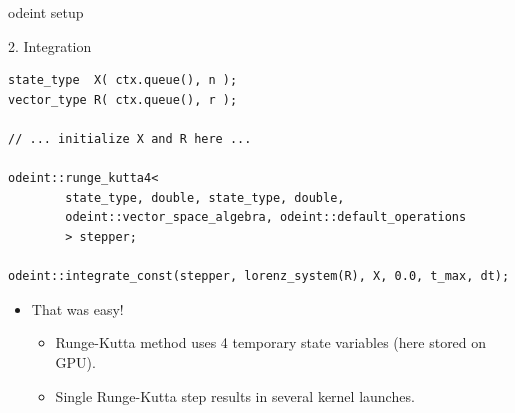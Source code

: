 \documentclass[@BEAMER_OPTIONS@]{beamer}
\begin{document}
\begin{frame}[fragile]{odeint setup}
    \begin{exampleblock}{2. Integration}
        \begin{lstlisting}
state_type  X( ctx.queue(), n );
vector_type R( ctx.queue(), r );

// ... initialize X and R here ...

odeint::runge_kutta4<
        state_type, double, state_type, double,
        odeint::vector_space_algebra, odeint::default_operations
        > stepper;

odeint::integrate_const(stepper, lorenz_system(R), X, 0.0, t_max, dt);
        \end{lstlisting}
    \end{exampleblock}
    \begin{itemize}
        \item That was easy!  
            \begin{itemize}
                \item<4|alert@4> Runge-Kutta method uses 4 temporary state variables
                    (here stored on GPU).
                \item<4|alert@4> Single Runge-Kutta step results in several
                    kernel launches.
            \end{itemize}
    \end{itemize}
\end{frame}

\end{document}
